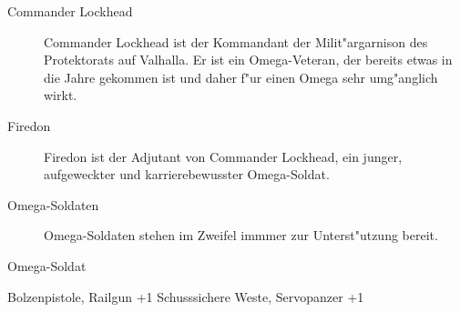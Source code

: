 
\begin{description}
    \item[Commander Lockhead] Commander Lockhead ist der Kommandant der Milit"argarnison des Protektorats auf Valhalla. Er ist ein 
        Omega-Veteran, der bereits etwas in die Jahre gekommen ist und daher f"ur einen Omega sehr umg"anglich wirkt.
    \item[Firedon] Firedon ist der Adjutant von Commander Lockhead, ein junger, aufgeweckter und karrierebewusster Omega-Soldat.
    \item[Omega-Soldaten] Omega-Soldaten stehen im Zweifel immmer zur Unterst"utzung bereit.
\end{description}

\begin{nscsheet}{Omega-Soldat}
    \nscstats[ATT=3,AGG=2,CON=2]
    \nscruler
    \begin{nscinventory}
        \nscitem[Waffen] Bolzenpistole, Railgun +1
        \nscitem[R"ustung] Schusssichere Weste, Servopanzer +1
    \end{nscinventory}
\end{nscsheet}
